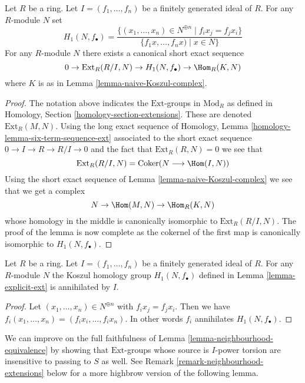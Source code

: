 \begin{lemma}
\label{lemma-explicit-ext}
Let $R$ be a ring. Let $I = (f_1, \ldots, f_n)$ be a finitely generated ideal
of $R$. For any $R$-module $N$ set
$$
H_1(N, f_\bullet) =
\frac{\{(x_1, \ldots, x_n) \in N^{\oplus n} \mid f_i x_j = f_j x_i \}}
{\{f_1x, \ldots, f_nx) \mid x \in N\}}
$$
For any $R$-module $N$ there exists a canonical short exact sequence
$$
0 \to \text{Ext}_R(R/I, N) \to H_1(N, f_\bullet) \to \Hom_R(K, N)
$$
where $K$ is as in
Lemma \ref{lemma-naive-Koszul-complex}.
\end{lemma}

\begin{proof}
The notation above indicates the $\text{Ext}$-groups in $\text{Mod}_R$
as defined in
Homology, Section \ref{homology-section-extensions}.
These are denoted $\text{Ext}_R(M, N)$. Using the long exact sequence of
Homology, Lemma \ref{homology-lemma-six-term-sequence-ext}
associated to the short exact sequence $0 \to I \to R \to R/I \to 0$
and the fact that $\text{Ext}_R(R, N) = 0$ we see that
$$
\text{Ext}_R(R/I, N) =
\text{Coker}(N \longrightarrow \Hom(I, N))
$$
Using the short exact sequence of
Lemma \ref{lemma-naive-Koszul-complex}
we see that we get a complex
$$
N \to \Hom(M, N) \to \Hom_R(K, N)
$$
whose homology in the middle is canonically isomorphic to
$\text{Ext}_R(R/I, N)$. The proof of the lemma is now complete
as the cokernel of the first map
is canonically isomorphic to $H_1(N, f_\bullet)$.
\end{proof}

\begin{lemma}
\label{lemma-koszul-homology-annihilated}
Let $R$ be a ring. Let $I = (f_1, \ldots, f_n)$ be a finitely generated ideal
of $R$. For any $R$-module $N$ the Koszul homology group
$H_1(N, f_\bullet)$ defined in
Lemma \ref{lemma-explicit-ext}
is annihilated by $I$.
\end{lemma}

\begin{proof}
Let $(x_1, \ldots, x_n) \in N^{\oplus n}$ with $f_i x_j = f_j x_i$.
Then we have $f_i(x_1, \ldots, x_n) = (f_i x_i, \ldots, f_i x_n)$.
In other words $f_i$ annihilates $H_1(N, f_\bullet)$.
\end{proof}

\noindent
We can improve on the full faithfulness of
Lemma \ref{lemma-neighbourhood-equivalence}
by showing that $\text{Ext}$-groups whose source is $I$-power torsion
are insensitive to passing to $S$ as well. See
Remark \ref{remark-neighbourhood-extensions}
below for a more highbrow version of the following lemma.

